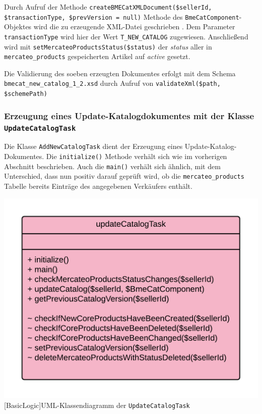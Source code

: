 	Durch Aufruf der Methode \texttt{createBMECatXMLDocument(\$sellerId, \$transactionType, \$prevVersion = null)} Methode des \texttt{BmeCatComponent}-Objektes wird die zu erzeugende XML-Datei geschrieben . Dem Parameter \texttt{transactionType} wird hier der Wert \texttt{T\_NEW\_CATALOG} zugewiesen. Anschließend wird mit \texttt{setMercateoProductsStatus(\$status)} der \textit{status} aller in \texttt{mercateo\_products} gespeicherten Artikel auf \textit{active} gesetzt.

	Die Validierung des soeben erzeugten Dokumentes erfolgt mit dem Schema \texttt{bmecat\_new\_catalog\_1\_2.xsd} durch Aufruf von \texttt{validateXml(\$path, \$schemePath)}
	
	
	
	\subsubsection{Erzeugung eines Update-Katalogdokumentes  mit der Klasse \texttt{UpdateCatalogTask}}
	
	Die Klasse \texttt{AddNewCatalogTask} dient der Erzeugung eines Update-Katalog-Dokumentes. Die \texttt{initialize()} Methode verhält sich wie im vorherigen Abschnitt beschrieben. Auch die \texttt{main()} verhält sich ähnlich, mit dem Unterschied, dass nun positiv darauf geprüft wird, ob die \texttt{mercateo\_products} Tabelle bereits Einträge des angegebenen Verkäufers enthält. \\
	\begin{minipage}{\linewidth}
		\vspace{1em}
		\centering
		\includegraphics[width=0.7 \linewidth]{img/UpdateCatalogTaskUML}
		[BasicLogic]{UML-Klassendiagramm der \texttt{UpdateCatalogTask}}
		\vspace{1em}
	\end{minipage}
	
